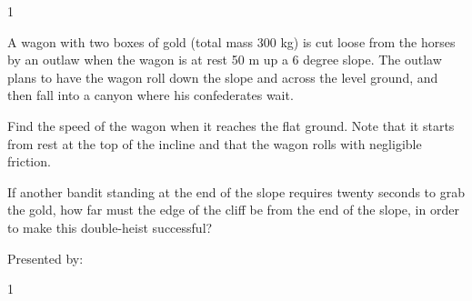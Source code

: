 \vfill
\newpage


\AddToShipoutPicture*{\BackgroundPic}

\addtocounter {ProbNum} {1}

 
{\bf \Large{}} A wagon with two boxes of gold (total mass 300 kg) is cut loose from the horses by an outlaw when the wagon is at rest 50 m up a 6 degree slope. The outlaw plans to have the wagon roll down the slope and across the level ground, and then fall into a canyon where his confederates wait. 

\bigskip
Find the speed of the wagon when it reaches the flat ground. Note that it starts from rest at the top of the incline and that the wagon rolls with negligible friction.

\vfill

\vfill
If another bandit standing at the end of the slope requires twenty seconds to grab the gold, how far must the edge of the cliff be from the end of the slope, in order to make this double-heist successful?



\vfill
\newpage


\AddToShipoutPicture*{\BackgroundPic}


\bigskip
{\large Presented by: }\underline{\hspace{5cm}}




\vfill
\newpage


\AddToShipoutPicture*{\BackgroundPic}

\addtocounter {ProbNum} {1}

 
